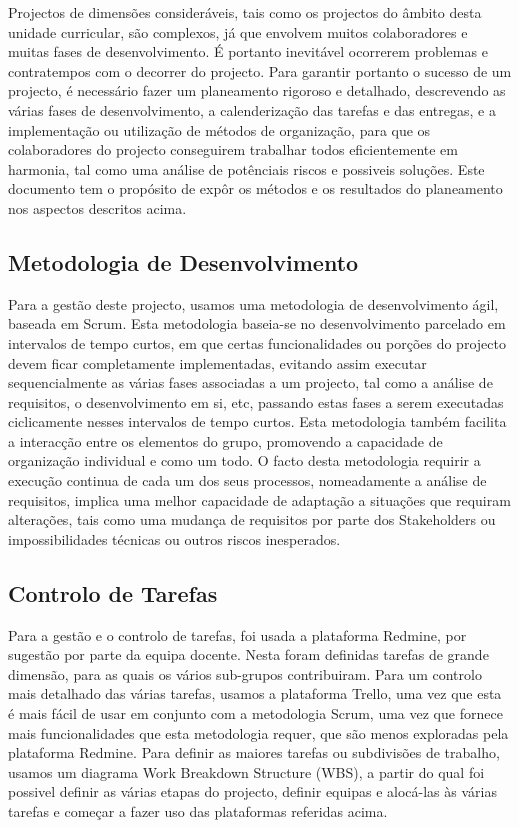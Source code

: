 Projectos de dimensões consideráveis, tais como os projectos do âmbito desta unidade curricular, são complexos, já que envolvem muitos colaboradores e muitas fases de desenvolvimento. É portanto inevitável ocorrerem problemas e contratempos com o decorrer do projecto.
Para garantir portanto o sucesso de um projecto, é necessário fazer um planeamento rigoroso e detalhado, descrevendo as várias fases de desenvolvimento, a calenderização das tarefas e das entregas, e a implementação ou utilização de métodos de organização, para que os colaboradores do projecto conseguirem trabalhar todos eficientemente em harmonia, tal como uma análise de potênciais riscos e possiveis soluções.
Este documento tem o propósito de expôr os métodos e os resultados do planeamento nos aspectos descritos acima.

\subsection*{Metodologia de Desenvolvimento}
Para a gestão deste projecto, usamos uma metodologia de desenvolvimento ágil, baseada em Scrum. Esta metodologia baseia-se no desenvolvimento parcelado em intervalos de tempo curtos, em que certas funcionalidades ou porções do projecto devem ficar completamente implementadas, evitando assim executar sequencialmente as várias fases associadas a um projecto, tal como a análise de requisitos, o desenvolvimento em si, etc, passando estas fases a serem executadas ciclicamente nesses intervalos de tempo curtos. Esta metodologia também facilita a interacção entre os elementos do grupo, promovendo a capacidade de organização individual e como um todo.
O facto desta metodologia requirir a execução continua de cada um dos seus processos, nomeadamente a análise de requisitos, implica uma melhor capacidade de adaptação a situações que requiram alterações, tais como uma mudança de requisitos por parte dos Stakeholders ou impossibilidades técnicas ou outros riscos inesperados.

\subsection*{Controlo de Tarefas}
Para a gestão e o controlo de tarefas, foi usada a plataforma Redmine, por sugestão por parte da equipa docente. Nesta foram definidas tarefas de grande dimensão, para as quais os vários sub-grupos contribuiram. Para um controlo mais detalhado das várias tarefas, usamos a plataforma Trello, uma vez que esta é mais fácil de usar em conjunto com a metodologia Scrum, uma vez que fornece mais funcionalidades que esta metodologia requer, que são menos exploradas pela plataforma Redmine.
Para definir as maiores tarefas ou subdivisões de trabalho, usamos um diagrama Work Breakdown Structure (WBS), a partir do qual foi possivel definir as várias etapas do projecto, definir equipas e alocá-las às várias tarefas e começar a fazer uso das plataformas referidas acima.

